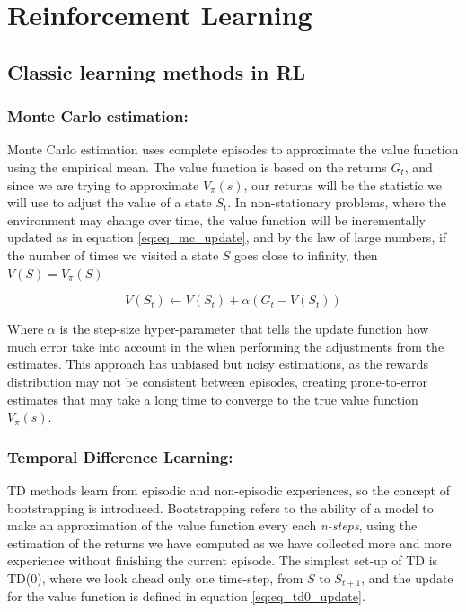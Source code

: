 \appendix           %
\appendixpage  		%
\addappheadtotoc 	%

\chapter{Reinforcement Learning}
\label{chap:appendix-c1}

\section{Classic learning methods in RL} \label{app:classic_rl}
\subsection{Monte Carlo estimation:} 
Monte Carlo estimation \cite{gerstner2021multilevel} uses complete episodes to approximate the value function using the empirical mean. The value function is based on the returns $G_t$, and since we are trying to approximate $V_{\pi}(s)$, our returns will be the statistic we will use to adjust the value of a state $S_t$. In non-stationary problems, where the environment may change over time, the value function will be incrementally updated as in equation \ref{eq:eq_mc_update}, and by the law of large numbers, if the number of times we visited a state $S$ goes close to infinity, then $V(S) = V_{\pi}(S)$ 

\begin{equation} \label{eq:eq_mc_update}
	V(S_t) \leftarrow V(S_t) + \alpha(G_t - V(S_t))
\end{equation}

Where $\alpha$ is the step-size hyper-parameter that tells the update function how much error take into account in the when performing the adjustments from the estimates. This approach has unbiased but noisy estimations, as the rewards distribution may not be consistent between episodes, creating prone-to-error estimates that may take a long time to converge to the true value function $V_{\pi}(s)$.

\subsection{Temporal Difference Learning:}
TD methods learn from episodic and non-episodic experiences, so the concept of bootstrapping is introduced. Bootstrapping refers to the ability of a model to make an approximation of the value function every each \textit{n-steps}, using the estimation of the returns we have computed as we have collected more and more experience without finishing the current episode. The simplest set-up of TD is TD(0), where we look ahead only one time-step, from $S$ to $S_{t+1}$, and the update for the value function is defined in equation \ref{eq:eq_td0_update}.

